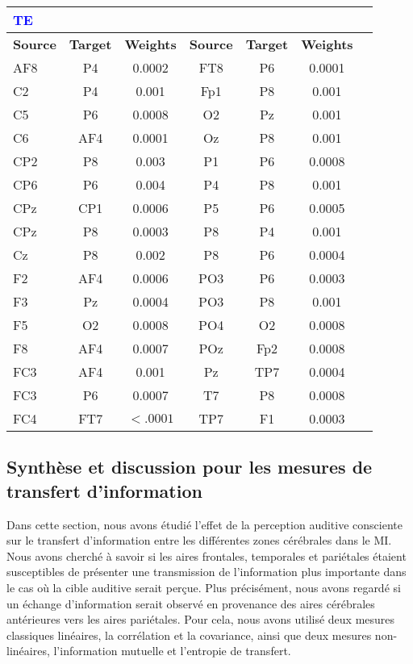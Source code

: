 \begin{table}[!t]
\begin{multicols}{2}
\begin{tabular}{|l|*{6}{c|}}
\hline
\textcolor{blue}{\textbf{TE}} & & & & & \\
\hline
\textbf{Source} & \textbf{Target} & \textbf{Weights} & \textbf{Source} & \textbf{Target} & \textbf{Weights} \\
\hline
AF8 & P4 & 0.0002 & FT8 & P6 & 0.0001 \\
C2 & P4 & 0.001 & Fp1 & P8 & 0.001 \\
C5 & P6 & 0.0008 & O2 & Pz & 0.001 \\
C6 & AF4 & 0.0001 & Oz & P8 & 0.001 \\
CP2 & P8 & 0.003 & P1 & P6 & 0.0008 \\
CP6 & P6 & 0.004 & P4 & P8 & 0.001 \\
CPz & CP1 & 0.0006 & P5 & P6 & 0.0005 \\
CPz & P8 & 0.0003 & P8 & P4 & 0.001 \\
Cz & P8 & 0.002 & P8 & P6 & 0.0004 \\
F2 & AF4 & 0.0006 & PO3 & P6 & 0.0003 \\
F3 & Pz & 0.0004 & PO3 & P8 & 0.001 \\
F5 & O2 & 0.0008 & PO4 & O2 & 0.0008 \\
F8 & AF4 & 0.0007 & POz & Fp2 & 0.0008 \\
FC3 & AF4 & 0.001 & Pz & TP7 & 0.0004 \\
FC3 & P6 & 0.0007 & T7 & P8 & 0.0008 \\
FC4 & FT7 & $<.0001$ & TP7 & F1 & 0.0003 \\
\hline
\end{tabular}
\end{multicols}
\end{table}

\subsection{Synthèse et discussion pour les mesures de transfert d'information}
\label{synthesediscussiontransmissiondinfo}

Dans cette section, nous avons étudié l'effet de la perception auditive consciente sur le transfert d'information entre les différentes zones cérébrales dans le MI. 
Nous avons cherché à savoir si les aires frontales, temporales et pariétales étaient susceptibles de présenter une transmission de l'information plus importante dans le cas où la cible auditive serait perçue. 
Plus précisément, nous avons regardé si un échange d'information serait observé en provenance des aires cérébrales antérieures vers les aires pariétales. 
Pour cela, nous avons utilisé deux mesures classiques linéaires, la corrélation et la covariance, ainsi que deux mesures non-linéaires, l'information mutuelle et l'entropie de transfert. 

